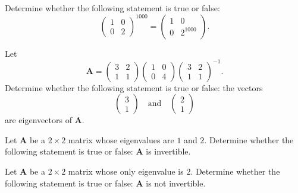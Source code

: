 \documentclass[11pt,oneside]{article}
\begin{document}
\begin{problem}
Determine whether the following statement is true or false:
\[
\begin{pmatrix}
1&0\\
0&2
\end{pmatrix}^{1000}
=
\begin{pmatrix}
1&0\\
0&2^{1000}
\end{pmatrix}.
\]
\end{problem}

\begin{problem}
Let
\[
\mathbf A=
\begin{pmatrix}
3&2\\
1&1
\end{pmatrix}
\begin{pmatrix}
1&0\\
0&4
\end{pmatrix}
\begin{pmatrix}
3&2\\
1&1
\end{pmatrix}^{-1}.
\]
Determine whether the following statement is true or false: the vectors
\[
\begin{pmatrix}3\\1\end{pmatrix}
\quad\text{and}\quad
\begin{pmatrix}2\\1\end{pmatrix}
\]
are eigenvectors of $\mathbf A$.
\end{problem}

\begin{problem}
Let $\mathbf A$ be a $2\times2$ matrix whose eigenvalues are $1$ and $2$. Determine whether the following statement is true or false: $\mathbf A$ is invertible.
\end{problem}

\begin{problem}
Let $\mathbf A$ be a $2\times2$ matrix whose only eigenvalue is $2$. Determine whether the following statement is true or false: $\mathbf A$ is not invertible.
\end{problem}
\end{document}
